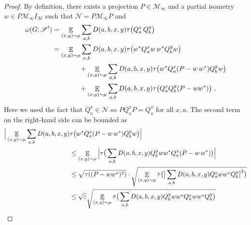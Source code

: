 \documentclass[11pt]{article}
\theoremstyle{definition}
\newcommand{\strategy}{\mathscr{S}}
\newcommand{\ket}[1]{|#1\rangle}
\newcommand{\bra}[1]{\langle#1|}
\DeclareMathOperator*{\Expectation}{\mathbb{E}}
\newcommand{\Es}[1]{\Expectation_{#1}}
\newcommand{\mM}{\ensuremath{\mathcal{M}}}
\newcommand{\eps}{\varepsilon}
\newcommand{\mN}{\mathcal{N}}
\begin{document}
\begin{proof}
By definition, there exists a projection $P \in \mM_\infty$ and a partial isometry $w \in P \mM_\infty I_\mM$ such that $\mN = P \mM_\infty P$ and
\begin{align}
\omega(G;\strategy') &= \Es{(x,y)\sim\mu} \sum_{a,b} D(a,b,x,y)  \tau\big( Q^x_a \, Q^y_b \big)\notag\\
&=  \Es{(x,y)\sim\mu} \sum_{a,b} D(a,b,x,y)  \tau\big( w^* Q^x_a w\, w^* Q^y_b w\big)\notag\\
&\qquad\qquad+  \Es{(x,y)\sim\mu} \sum_{a,b} D(a,b,x,y)  \tau\big( w^* Q^x_a (P - w\, w^* ) Q^y_b w\big) \notag\\
&\qquad\qquad+ \Es{(x,y)\sim\mu} \sum_{a,b} D(a,b,x,y)  \tau\big(Q^x_a  Q^y_b (P-ww^*)\big)~.\label{eq:cv-0}
\end{align}
Here we used the fact that $Q^x_a \in \mN$ so $P Q^x_a P = Q^x_a$ for all $x,a$. 
The second term on the right-hand side can be bounded as
\begin{align}
\Big|\Es{(x,y)\sim\mu} \sum_{a,b} D(a,b,x,y) & \tau\big( w^* Q^x_a (P - w\, w^* ) Q^y_b w\big)\Big|\notag\\
&\leq \Es{(x,y)\sim\mu} \Big | \tau\big( \sum_{a,b} D(a,b,x,y)   Q^y_b w w^* Q^x_a (P - w\, w^* ) \big) \Big | \notag\\
&\leq \sqrt{ \tau((P - ww^*)^2)} \cdot \sqrt{\Es{(x,y)\sim\mu} \tau\big( \big| \sum_{a,b} D(a,b,x,y)   Q^x_a w w^* Q^y_b \big|^2 \big) } \notag\\
&\leq \sqrt{\eps}\sqrt{ \Es{(x,y)\sim\mu} \tau\big( \sum_{a,b} D(a,b,x,y)   Q^y_b ww^* Q^x_a w w^* Q^y_b \big) } \notag\\

\end{align}
\end{proof}
\end{document}
